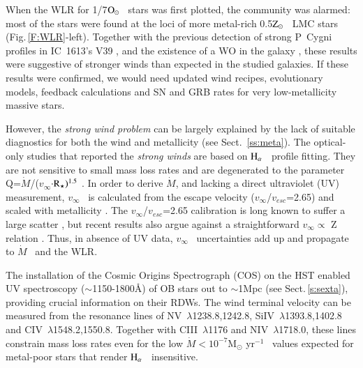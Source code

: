 \documentclass{iau}
\newcommand{\Osun}{$\rm O_{\odot}$}
\newcommand{\Zsun}{$\rm Z_{\odot}$}
\newcommand{\Teff}{\mbox{$T_{\rm eff}$}}
\newcommand{\vinf}{\mbox{$v_{\infty}$}}
\newcommand{\vesc}{\mbox{$v_{esc}$}}
\newcommand{\Mdot}{$\dot M$}
\newcommand{\myr}{M$_{\odot}$ yr$^{-1}$}
\newcommand{\halpha}{$\rm H_{\alpha}$}
\begin{document}

When the WLR for 1/7\Osun~ stars was first plotted, the community was alarmed:
most of the stars were found at the loci of more metal-rich 0.5\Zsun~ LMC stars (Fig.\,\ref{F:WLR}-left).
Together with the previous detection of strong P~Cygni profiles in IC~1613's V39 \citep{Hal10},
and the existence of a WO in the galaxy \citep[e.g.][]{Tral15},
these results were suggestive of stronger winds than expected in the studied galaxies.
If these results were confirmed, we would need updated wind recipes, evolutionary
models, feedback calculations and SN and GRB rates for very low-metallicity massive stars.

However, the \textit{strong wind problem} can be largely explained by the lack of suitable
diagnostics for both the wind and metallicity (see Sect.~\ref{ss:meta}).
The optical-only studies that reported the \textit{strong winds}
are based on \halpha~ profile fitting.
They are not sensitive to small mass loss rates and
are degenerated to the parameter 
Q=\Mdot/(\vinf$\rm \cdot R_{\star})^{1.5}$ \citep{KP00}.
In order to derive \Mdot, and lacking a direct ultraviolet (UV) measurement,
\vinf~ is calculated from the escape velocity (\vinf/\vesc=2.65)
and scaled with metallicity \citep[\vinf$\propto$Z$^{0.13}$][]{LRD92}.
The \vinf/\vesc=2.65 calibration is long known to suffer a large scatter \citep{KP00},
but recent results also argue against a straightforward \vinf $\propto$ Z relation \citep{Gal14}.
Thus, in absence of UV data, \vinf~ uncertainties add up and propagate to \Mdot~ and the WLR.


The installation of the Cosmic Origins Spectrograph (COS)
on the HST enabled UV spectroscopy ($\sim$1150-1800\AA)
of OB stars out to $\sim$1Mpc (see Sect.\,\ref{s:sexta}),
providing crucial information on their RDWs.
The wind terminal velocity can be measured from
the resonance lines of
NV~$\lambda$1238.8,1242.8,
SiIV~$\lambda$1393.8,1402.8 and
CIV~$\lambda$1548.2,1550.8.
Together with CIII~$\lambda$1176 and NIV~$\lambda$1718.0,
these lines
constrain mass loss rates even for the low \Mdot$< 10^{-7}$\myr~
values expected for metal-poor stars
that render \halpha~ insensitive.
\end{document}
